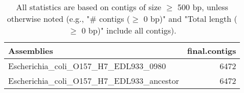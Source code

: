 \documentclass[12pt,a4paper]{article}
\begin{document}
\begin{table}[ht]
\begin{center}
\caption{All statistics are based on contigs of size $\geq$ 500 bp, unless otherwise noted (e.g., "\# contigs ($\geq$ 0 bp)" and "Total length ($\geq$ 0 bp)" include all contigs).}
\begin{tabular}{|l*{1}{|r}|}
\hline
Assemblies & final.contigs \\ \hline
Escherichia\_coli\_O157\_H7\_EDL933\_0980 & 6472 \\ \hline
Escherichia\_coli\_O157\_H7\_EDL933\_ancestor & 6472 \\ \hline
\end{tabular}
\end{center}
\end{table}
\end{document}
